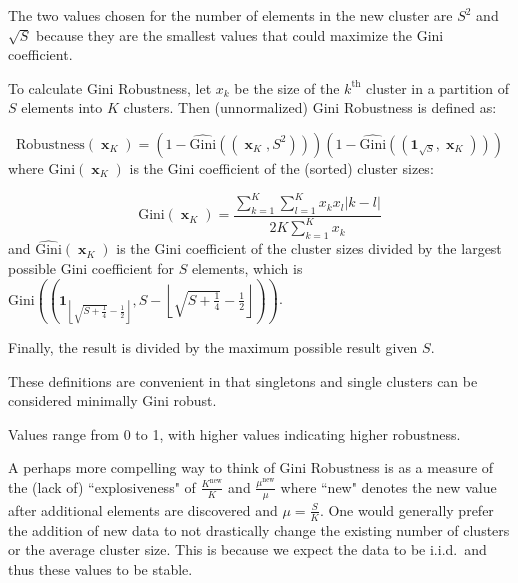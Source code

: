 \documentclass[8pt]{extarticle}
\newcommand{\x}[1]{\mathop{{}\mathbf{x}}\nolimits_{#1}}
\begin{document}
    The two values chosen for the number of elements in the new cluster are $S^2$ and $\sqrt{S} $ because they are the smallest values that could maximize the Gini coefficient.

    To calculate Gini Robustness, let $x_k$ be the size of the $k^{\text{th}}$ cluster in a partition of $S$ elements into $K$ clusters.
    Then (unnormalized) Gini Robustness is defined as:

    \[\text{Robustness}(\x{K}) = \left(1 - \widehat{\text{Gini}}\left(\left(\x{K}, S^2\right)\right)\right) \left(1 - \widehat{\text{Gini}}\left(\left(\mathbf{1}_{\sqrt{S}}, \x{K}\right)\right)\right)\]
    where $\text{Gini}\left(\x{K}\right)$ is the Gini coefficient of the (sorted) cluster sizes:

    \[\text{Gini}(\x{K}) = \frac{\sum_{k=1}^K\sum_{l=1}^Kx_k x_l |k-l|}{2K\sum_{k=1}^K x_k}\]
    and $\widehat{\text{Gini}}\left(\x{K}\right)$ is the Gini coefficient of the cluster sizes divided by the largest possible Gini coefficient for $S$ elements, which is
    $\text{Gini}\left(\left(\mathbf{1}_{\left\lfloor\sqrt{S+\frac{1}{4}}-\frac{1}{2}\right\rfloor}, S - \left\lfloor\sqrt{S+\frac{1}{4}}-\frac{1}{2}\right\rfloor\right)\right)$.

    Finally, the result is divided by the maximum possible result given $S$.

    These definitions are convenient in that singletons and single clusters can be considered minimally Gini robust.

    Values range from 0 to 1, with higher values indicating higher robustness.

    A perhaps more compelling way to think of Gini Robustness is as a measure of the (lack of) ``explosiveness" of $\frac{K^{\text{new}}}{K}$ and $\frac{\mu^{\text{new}}}{\mu}$ where ``new" denotes the new value after additional elements are discovered and $\mu=\frac{S}{K}$.
    One would generally prefer the addition of new data to not drastically change the existing number of clusters or the average cluster size.
    This is because we expect the data to be i.i.d.\ and thus these values to be stable.
\end{document}
